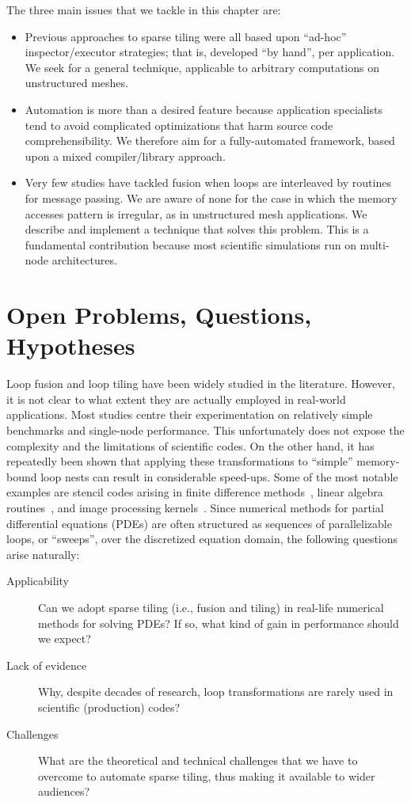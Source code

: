 The three main issues that we tackle in this chapter are:

\begin{itemize}
\item Previous approaches to sparse tiling were all based upon ``ad-hoc'' inspector/executor strategies; that is, developed ``by hand'', per application. We seek for a general technique, applicable to arbitrary computations on unstructured meshes.
\item Automation is more than a desired feature because application specialists tend to avoid complicated optimizations that harm source code comprehensibility. We therefore aim for a fully-automated framework, based upon a mixed compiler/library approach.
\item Very few studies have tackled fusion when loops are interleaved by routines for message passing. We are aware of none for the case in which the memory accesses pattern is irregular, as in unstructured mesh applications. We describe and implement a technique that solves this problem. This is a fundamental contribution because most scientific simulations run on multi-node architectures.
\end{itemize}

\section{Open Problems, Questions, Hypotheses}
\label{sec:tiling:struct}
Loop fusion and loop tiling have been widely studied in the literature. However, it is not clear to what extent they are actually employed in real-world applications. Most studies centre their experimentation on relatively simple benchmarks and single-node performance. This unfortunately does not expose the complexity and the limitations of scientific codes. On the other hand, it has repeatedly been shown that applying these transformations to ``simple'' memory-bound loop nests can result in considerable speed-ups. Some of the most notable examples are stencil codes arising in finite difference methods~\citep{vect-tiled-ho-fd,ics-stencil-tiling,cohen-timetiling}, linear algebra routines~\citep{qr-fact-tiled,blas-tiling}, and image processing kernels~\citep{Halide}. Since numerical methods for partial differential equations (PDEs) are often structured as sequences of parallelizable loops, or ``sweeps'', over the discretized equation domain, the following questions arise naturally: 

\begin{description}
\item[Applicability] Can we adopt sparse tiling (i.e., fusion and tiling) in real-life numerical methods for solving PDEs? If so, what kind of gain in performance should we expect?
\item[Lack of evidence] Why, despite decades of research, loop transformations are rarely used in scientific (production) codes? 
\item[Challenges] What are the theoretical and technical challenges that we have to overcome to automate sparse tiling, thus making it available to wider audiences?
\end{description}

